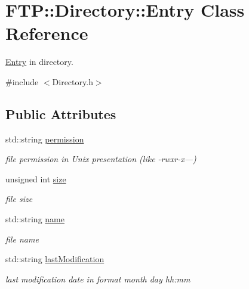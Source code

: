 \hypertarget{struct_f_t_p_1_1_directory_1_1_entry}{\section{F\-T\-P\-:\-:Directory\-:\-:Entry Class Reference}
\label{struct_f_t_p_1_1_directory_1_1_entry}
}


\hyperlink{struct_f_t_p_1_1_directory_1_1_entry}{Entry} in directory.  




{\ttfamily \#include $<$Directory.\-h$>$}

\subsection*{Public Attributes}
\begin{DoxyCompactItemize}
\item 
\hypertarget{struct_f_t_p_1_1_directory_1_1_entry_aac9c20aeb62b9a48ebd1e8bfb897aabf}{std\-::string \hyperlink{struct_f_t_p_1_1_directory_1_1_entry_aac9c20aeb62b9a48ebd1e8bfb897aabf}{permission}}\label{struct_f_t_p_1_1_directory_1_1_entry_aac9c20aeb62b9a48ebd1e8bfb897aabf}

\begin{DoxyCompactList}\small\item\em file permission in Unix presentation (like -\/rwxr-\/x---) \end{DoxyCompactList}\item 
\hypertarget{struct_f_t_p_1_1_directory_1_1_entry_a75b6770d2c8fd215755a7ad5f3187e25}{unsigned int \hyperlink{struct_f_t_p_1_1_directory_1_1_entry_a75b6770d2c8fd215755a7ad5f3187e25}{size}}\label{struct_f_t_p_1_1_directory_1_1_entry_a75b6770d2c8fd215755a7ad5f3187e25}

\begin{DoxyCompactList}\small\item\em file size \end{DoxyCompactList}\item 
\hypertarget{struct_f_t_p_1_1_directory_1_1_entry_a7476d45d4a0267cbf9e708bbc5bdc3e1}{std\-::string \hyperlink{struct_f_t_p_1_1_directory_1_1_entry_a7476d45d4a0267cbf9e708bbc5bdc3e1}{name}}\label{struct_f_t_p_1_1_directory_1_1_entry_a7476d45d4a0267cbf9e708bbc5bdc3e1}

\begin{DoxyCompactList}\small\item\em file name \end{DoxyCompactList}\item 
\hypertarget{struct_f_t_p_1_1_directory_1_1_entry_adc85896558570dd9d34709848804ce78}{std\-::string \hyperlink{struct_f_t_p_1_1_directory_1_1_entry_adc85896558570dd9d34709848804ce78}{last\-Modification}}\label{struct_f_t_p_1_1_directory_1_1_entry_adc85896558570dd9d34709848804ce78}

\begin{DoxyCompactList}\small\item\em last modification date in format month day hh\-:mm \end{DoxyCompactList}\end{DoxyCompactItemize}


